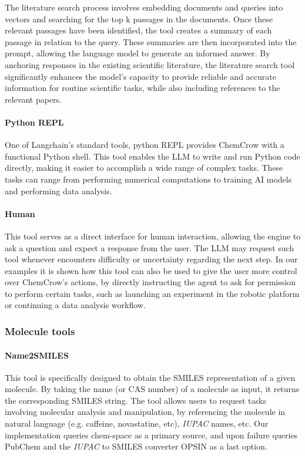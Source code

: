 \documentclass[10pt]{article}
\begin{document}
The literature search process involves embedding documents and queries into vectors and searching for the top k passages in the documents. Once these relevant passages have been identified, the tool creates a summary of each passage in relation to the query. These summaries are then incorporated into the prompt, allowing the language model to generate an informed answer. By anchoring responses in the existing scientific literature, the literature search tool significantly enhances the model's capacity to provide reliable and accurate information for routine scientific tasks, while also including references to the relevant papers.

\paragraph{Python REPL}
One of Langchain's standard tools, python REPL provides ChemCrow with a functional Python shell. This tool enables the LLM to write and run Python code directly, making it easier to accomplish a wide range of complex tasks. These tasks can range from performing numerical computations to training AI models and performing data analysis.

\paragraph{Human}
This tool serves as a direct interface for human interaction, allowing the engine to ask a question and expect a response from the user. The LLM may request such tool whenever  encounters difficulty or uncertainty regarding the next step. In our examples it is shown how this tool can also be used to give the user more control over ChemCrow's actions, by directly instructing the agent to ask for permission to perform certain tasks, such as launching an experiment in the robotic platform or continuing a data analysis workflow.


\subsubsection{Molecule tools}
\paragraph{Name2SMILES}
This tool is specifically designed to obtain the SMILES representation of a given molecule. By taking the name (or CAS number) of a molecule as input, it returns the corresponding SMILES string. The tool allows users to request tasks involving molecular analysis and manipulation, by referencing the molecule in natural language (e.g. caffeine, novastatine, etc), \textit{IUPAC} names, etc. Our implementation queries chem-space\cite{ChemSpace} as a primary source, and upon failure queries PubChem\cite{pubchem} and the \textit{IUPAC} to SMILES converter OPSIN\cite{lowe2011chemical} as a last option.
\end{document}
